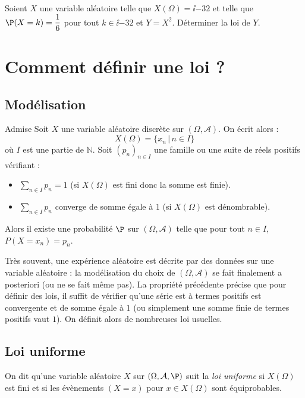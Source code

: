 \documentclass[french,11pt,twoside]{VcCours}
\begin{document}
\newpage

\phantom{test}

\vspace{4cm}

\begin{ApplicationDirecte}{} Soient $X$ une variable aléatoire telle que $X(\Omega) = \ii {-3}2$ et telle que $\P(X=k) = \dfrac 16$ pour tout $k \in \ii {-3}2$ et $Y = X^2$. Déterminer la loi de $Y$.
 \end{ApplicationDirecte}

\section{Comment définir une loi ?}
\subsection{Modélisation}
\begin{Proposition}{Admise}
Soit $X$ une variable aléatoire discrète sur $(\Omega, \mathcal{A})$. On écrit alors :
$$ X(\Omega)= \lbrace x_n \, \vert \, n \in I \rbrace$$
où $I$ est une partie de $\mathbb{N}$. Soit $(p_n)_{n \in I}$ une famille ou une suite de réels positifs vérifiant :
\begin{itemize}
\item $\sum_{n \in I} p_n = 1$ (si $X(\Omega)$ est fini donc la somme est finie).
\item $\sum_{n \in I} p_n$ converge de somme égale à $1$ (si $X(\Omega)$ est dénombrable).
\end{itemize}
Alors il existe une probabilité $\P$ sur $(\Omega, \mathcal{A})$ telle que pour tout $n \in I$, $P(X=x_n)=p_n$.
\end{Proposition}

Très souvent, une expérience aléatoire est décrite par des données sur une variable aléatoire : la modélisation du choix de $(\Omega, \mathcal{A})$ se fait finalement a posteriori (ou ne se fait même pas).  La propriété précédente précise que pour définir des lois, il suffit de vérifier qu'une série est à termes positifs est convergente et de somme égale à $1$ (ou simplement une somme finie de termes positifs vaut $1$). On définit alors de nombreuses loi usuelles.

\subsection{Loi uniforme}

\begin{Definition}{} On dit qu'une variable aléatoire $X$ sur $(\Omega, \mathcal{A}, \P)$ suit la \emph{loi uniforme} si $X(\Omega)$ est fini et si les évènements $(X=x)$ pour $x \in X(\Omega)$ sont équiprobables.
\end{Definition}
\end{document}
